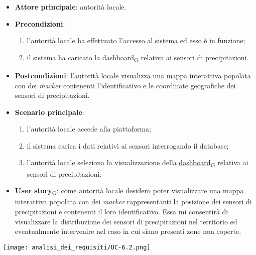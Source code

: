 \begin{itemize}
	\item \textbf{Attore principale}: autorità locale.
	\item \textbf{Precondizioni}:
	      \begin{enumerate}
		      \item l'autorità locale ha effettuato l'accesso al sistema ed esso è in funzione;
		      \item il sistema ha caricato la \href{https://7last.github.io/docs/pb/documentazione-interna/glossario\#dashboard}{dashboard\textsubscript{G}} relativa ai sensori di precipitazioni.
	      \end{enumerate}
	\item \textbf{Postcondizioni}: l'autorità locale visualizza una mappa interattiva popolata con dei \textit{marker} contenenti l'identificativo e le coordinate geografiche dei sensori di precipitazioni.
	\item \textbf{Scenario principale}:
	      \begin{enumerate}
		      \item l'autorità locale accede alla piattaforma;
		      \item il sistema carica i dati relativi ai sensori interrogando il database;
		      \item l'autorità locale seleziona la visualizzazione della \href{https://7last.github.io/docs/pb/documentazione-interna/glossario\#dashboard}{dashboard\textsubscript{G}} relativa ai sensori di precipitazioni.
	      \end{enumerate}
	\item \href{https://7last.github.io/docs/pb/documentazione-interna/glossario\#user-story}{\textbf{User story}\textsubscript{G}}:
	      come autorità locale desidero poter visualizzare una mappa interattiva popolata con dei \textit{marker} rappresentanti la posizione dei sensori di precipitazioni
	      e contenenti il loro identificativo. Essa mi consentirà di visualizzare la distribuzione dei sensori di precipitazioni nel territorio ed
	      eventualmente intervenire nel caso in cui siano presenti zone non coperte.
\end{itemize}
\begin{center}
	\texttt{[image: analisi\_dei\_requisiti/UC-6.2.png]}
\end{center}



